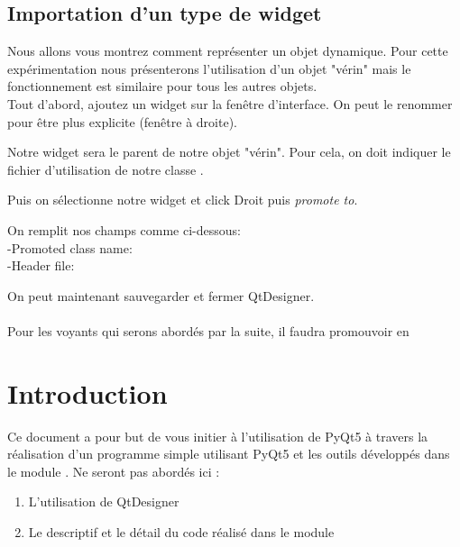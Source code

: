 {\section{Importation d'un type de widget}

Nous allons vous montrez comment représenter un objet dynamique. Pour cette expérimentation nous présenterons l'utilisation d'un objet "vérin" mais le fonctionnement est similaire pour tous les autres objets.\\

Tout d'abord, ajoutez un widget sur la fenêtre d'interface.
On peut le renommer pour être plus explicite (fenêtre à droite).

Notre widget sera le parent de notre objet "vérin". Pour cela, on doit indiquer le fichier d'utilisation de notre classe .


Puis on sélectionne notre widget et click Droit puis \textit{promote to}. 


On remplit nos champs comme ci-dessous:\\
-Promoted class name: \\
-Header file: 


On peut maintenant sauvegarder et fermer QtDesigner. \\

 \\

Pour les voyants qui serons abordés par la suite, il faudra promouvoir en \chapter{Introduction}

Ce document a pour but de vous initier à l'utilisation de PyQt5 à travers la réalisation d'un programme simple utilisant PyQt5 et les outils développés dans le module .\newline
Ne seront pas abordés ici :
\begin{enumerate}
\item L'utilisation de QtDesigner
\item Le descriptif et le détail du code réalisé dans le module 
\end{enumerate}


}
